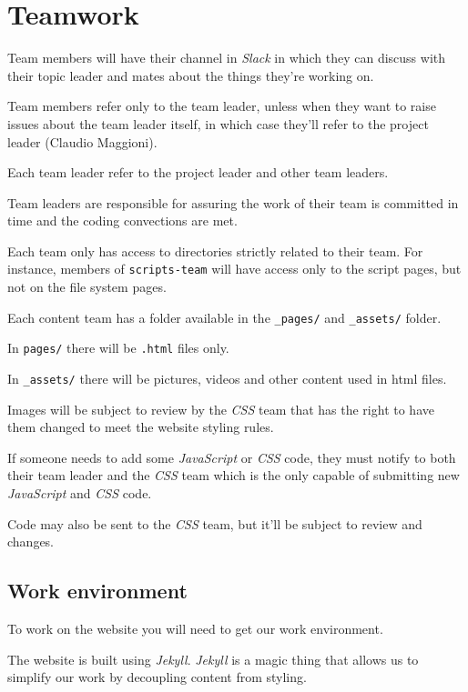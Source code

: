 \documentclass[hidelinks,12pt,a4paper,numbers=enddot]{scrartcl}
\begin{document}
\section{Teamwork}\label{teamwork}

Team members will have their channel in \emph{Slack} in which they can discuss
with their topic leader and mates about the things they're working on.

Team members refer only to the team leader, unless when they want to
raise issues about the team leader itself, in which case they'll refer to the
project leader (Claudio Maggioni).

Each team leader refer to the project leader and other team leaders.

Team leaders are responsible for assuring the work of their team is
committed in time and the coding convections are met.

Each team only has access to directories strictly related to their team.
For instance, members of \texttt{scripts-team} will have access only to
the script pages, but not on the file system pages.

Each content team has a folder available in the \texttt{\_pages/} and
\texttt{\_assets/} folder.

In \texttt{pages/} there will be \texttt{.html} files only.

In \texttt{\_assets/} there will be pictures, videos and other content used
in html files.

Images will be subject to review by the \emph{CSS} team that has the right to
have them changed to meet the website styling rules.

If someone needs to add some \emph{JavaScript} or \emph{CSS} code, they must notify to
both their team leader and the \emph{CSS} team which is the only capable of
submitting new \emph{JavaScript} and \emph{CSS} code.

Code may also be sent to the \emph{CSS} team, but it'll be subject to review
and changes.

\subsection{Work environment}\label{work-environment}

To work on the website you will need to get our work environment.

The website is built using \emph{Jekyll}. \emph{Jekyll} is a magic thing that
allows us to simplify our work by decoupling content from styling.
\end{document}
